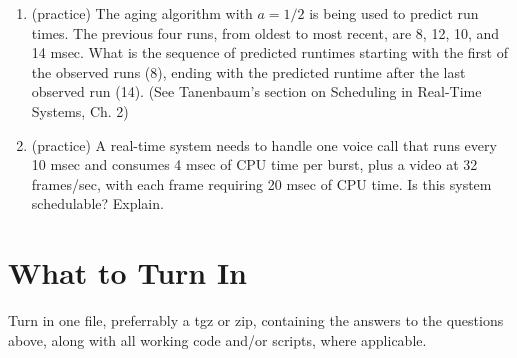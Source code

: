 \documentclass[12pt]{article}
\begin{document}
\begin{enumerate}
\item (practice) The aging algorithm with $a=1/2$ is being used to predict run
  times. The previous four runs, from oldest to most recent, are 8,
  12, 10, and 14 msec. What is the sequence of predicted runtimes
  starting with the first of the observed runs (8), ending with the
  predicted runtime after the last observed run (14). (See Tanenbaum's
  section on Scheduling in Real-Time Systems, Ch. 2)

  
\item (practice) A real-time system needs to handle one voice call that runs
  every 10 msec and consumes 4 msec of CPU time per burst, plus a
  video at 32 frames/sec, with each frame requiring 20 msec of CPU
  time. Is this system schedulable? Explain.

  




\end{enumerate}
\vspace{-.2in}
\section{What to Turn In}
Turn in one file, preferrably a tgz or zip, containing the answers to
the questions above, along with all working code and/or scripts, where applicable.
\end{document}
